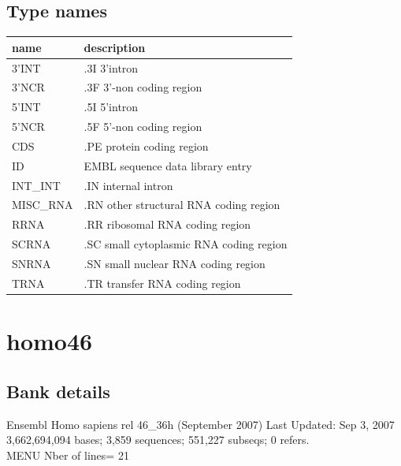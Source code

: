 \documentclass{article}
\begin{document}
\begin{Schunk}
\subsection{Type names}
\noindent\begin{tabular}{ll}
\hline \hline
name & description\\
\hline
3'INT & .3I 3'intron \\
3'NCR & .3F  3'-non coding region \\
5'INT & .5I 5'intron \\
5'NCR & .5F  5'-non coding region \\
CDS & .PE protein coding region \\
ID & EMBL sequence data library entry \\
INT\_INT & .IN  internal intron \\
MISC\_RNA & .RN other structural RNA coding region \\
RRNA & .RR ribosomal RNA coding region \\
SCRNA & .SC small cytoplasmic RNA coding region \\
SNRNA & .SN small nuclear RNA coding region \\
TRNA & .TR transfer RNA coding region \\
\hline \hline
\end{tabular}

\section{ homo46 }
\subsection{Bank details}
Ensembl Homo sapiens rel 46\_36h (September 2007) Last Updated: Sep  3, 2007\\
3,662,694,094 bases; 3,859 sequences; 551,227 subseqs; 0 refers.\\
MENU Nber of lines= 21


\end{Schunk}
\end{document}
